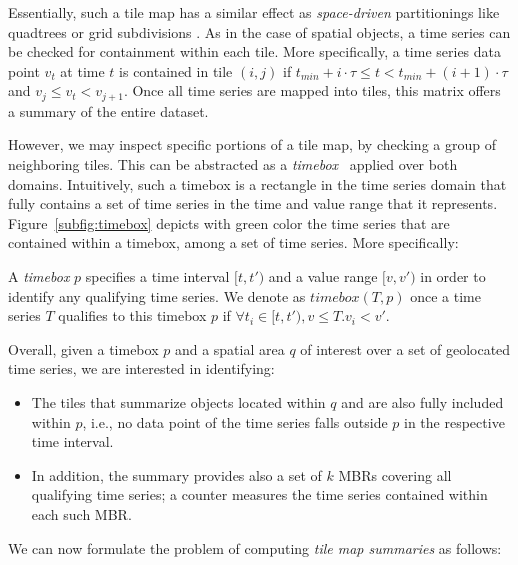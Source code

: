 Essentially, such a tile map has a similar effect as {\em space-driven} partitionings like quadtrees or grid subdivisions \cite{2001:SDA:377296}. As in the case of spatial objects, a time series can be checked for containment within each tile. More specifically, a time series data point $v_t$ at time $t$ is contained in tile $(i, j)$ if $t_{min}+i\cdot\tau \leq t < t_{min}+(i+1)\cdot\tau$ and $v_j \leq v_t < v_{j+1}$. Once all time series are mapped into tiles, this matrix offers a summary of the entire dataset.

However, we may inspect specific portions of a tile map, by checking a group of neighboring tiles. This can be abstracted as a {\em timebox}~\cite{hochheiser2003interactive} applied over both domains. Intuitively, such a timebox is a rectangle in the time series domain that fully contains a set of time series in the time and value range that it represents. Figure~\ref{subfig:timebox} depicts with green color the time series that are contained within a timebox, among a set of time series. More specifically:

\begin{mydefinition} [Timebox]
A {\em timebox} $p$ specifies a time interval $[t,t')$ and a value range $[v,v')$ in order to identify any qualifying time series. We denote as $timebox(T, p)$ once a time series $T$ qualifies to this timebox $p$ if $\forall t_i \in [t,t'), v \leq T.v_i < v'$.  
\end{mydefinition}

Overall, given a timebox $p$ and a spatial area $q$ of interest over a set of geolocated time series, we are interested in identifying:
\begin{itemize} 
\item The tiles that summarize objects located within $q$ and are also fully included within $p$, i.e., no data point of the time series falls outside $p$ in the respective time interval.
\item In addition, the summary provides also a set of $k$ MBRs covering all qualifying time series; a counter measures the time series contained within each such MBR. 
\end{itemize}
 
We can now formulate the problem of computing {\em tile map summaries} as follows:

